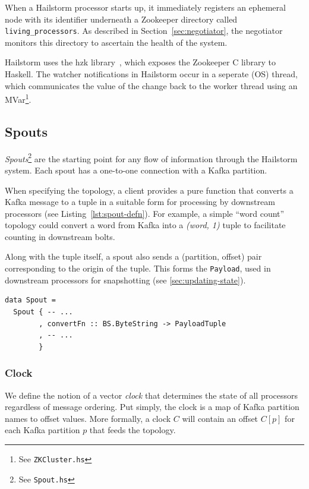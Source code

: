 \documentclass[10pt,nocopyrightspace]{sigplanconf}
\begin{document}
When a Hailstorm processor starts up, it immediately registers an ephemeral node
with its identifier underneath a Zookeeper directory called
\lstinline{living_processors}. As described in Section~\ref{sec:negotiator}, the
negotiator monitors this directory to ascertain the health of the system.

Hailstorm uses the hzk library~\cite{hzk}, which exposes the
Zookeeper C library to Haskell. The watcher notifications in Hailstorm occur in
a seperate (OS) thread, which communicates the value of the change
back to the worker thread using an MVar\footnote{See \texttt{ZKCluster.hs}}.

\subsection{Spouts}

\textit{Spouts}\footnote{See \texttt{Spout.hs}} are the starting point for any
flow of information through the Hailstorm system. Each spout has a one-to-one
connection with a Kafka partition.

When specifying the topology, a client provides a pure function that converts a
Kafka message to a tuple in a suitable form for processing by downstream
processors (see Listing~\ref{lst:spout-defn}).  For example, a simple ``word
count'' topology could convert a word from Kafka into a \textit{(word, 1)}
tuple to facilitate counting in downstream bolts.

Along with the tuple itself, a spout also sends a (partition, offset) pair
corresponding to the origin of the tuple. This forms the \texttt{Payload}, 
used in downstream processors for snapshotting (see \ref{sec:updating-state}).

\begin{lstlisting}[caption=Client interface for a
spout,label=lst:spout-defn,float]
data Spout =
  Spout { -- ...
        , convertFn :: BS.ByteString -> PayloadTuple
        , -- ...
        }
\end{lstlisting}

\subsubsection{Clock}
\label{sec:clock}

We define the notion of a vector \textit{clock} that determines the 
state of all processors regardless of message ordering.  Put
simply, the clock is a map of Kafka partition names to offset values.
More formally, a clock $C$ will contain an offset
$C[p]$ for each Kafka partition $p$ that feeds the topology.
\end{document}

